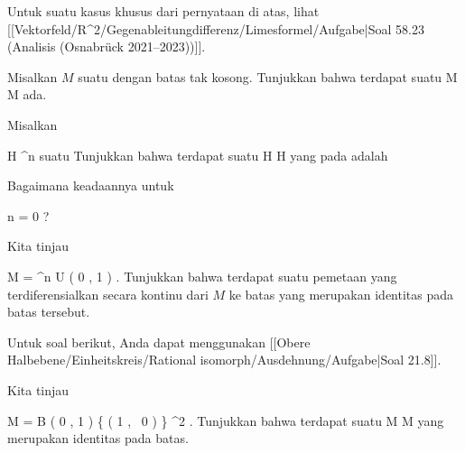 Untuk suatu kasus khusus dari pernyataan di atas, lihat
[[Vektorfeld/R^2/Gegenableitungdifferenz/Limesformel/Aufgabe|Soal 58.23 (Analisis (Osnabrück 2021--2023))]].

{}
{

Misalkan $M$ suatu
dengan batas tak kosong. Tunjukkan bahwa terdapat suatu
\maabb {} { M } { \partial M
} {}
ada.

}
{} {}

{}
{

Misalkan

\mavergleichskette
{\vergleichskette
{ H
}
{ \subseteq }{ \R^n
}
{  }{
}
{    }{
}
{   }{
}
}
{}{}{}
 {} {}
suatu
Tunjukkan bahwa terdapat suatu
\maabbdisp {\varphi} { H } { \partial H
} {}
yang
pada
 adalah

}
{Bagaimana keadaannya untuk

\mavergleichskette
{\vergleichskette
{ n
}
{ = }{ 0
}
{  }{
}
{    }{
}
{   }{
}
}
{}{}{}?} {}

{}
{

Kita tinjau

\mavergleichskette
{\vergleichskette
{ M
}
{ = }{ \R^n \setminus  U \left(   0 , 1  \right)
}
{  }{
}
{    }{
}
{   }{
}
}
{}{}{.}
Tunjukkan bahwa terdapat suatu pemetaan yang terdiferensialkan secara kontinu dari $M$ ke batas
yang merupakan identitas pada batas tersebut.

}
{} {}

Untuk soal berikut, Anda dapat menggunakan
[[Obere Halbebene/Einheitskreis/Rational isomorph/Ausdehnung/Aufgabe|Soal 21.8]].

{}
{

Kita tinjau

\mavergleichskettedisp
{\vergleichskette
{ M
}
{ =} { B  \left(  0 , 1 \right) \setminus \{  \left(  1   , \,   0                   \right) \}
}
{ \subseteq} { \R^2
}
{ } {
}
{ } {
}
}
{}{}{.}
Tunjukkan bahwa terdapat suatu
\maabbdisp {\varphi} { M } { \partial M
} {}
yang merupakan identitas pada batas.

}
{} {}

